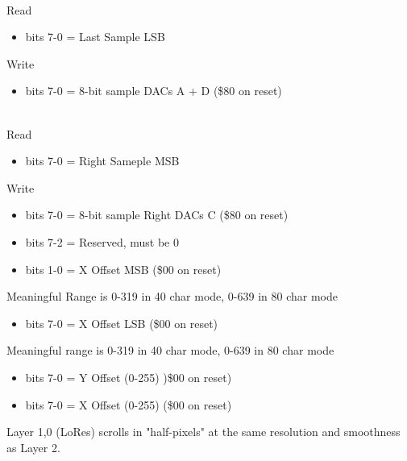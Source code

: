 \\
Read
\begin{itemize}
\item bits 7-0 = \iis Last Sample LSB
\end{itemize}
Write
\begin{itemize}
\item bits 7-0 = 8-bit sample DACs A + D (\$80 on reset)
\end{itemize}

\\
Read
\begin{itemize}
\item bits 7-0 = \iis Right Sameple MSB
\end{itemize}
Write
\begin{itemize}
\item bits 7-0 = 8-bit sample Right DACs C (\$80 on reset)
\end{itemize}

\begin{itemize}
\item bits 7-2 = Reserved, must be 0
\item bits 1-0 = X Offset MSB (\$00 on reset)
\end{itemize}
Meaningful Range is 0-319 in 40 char mode, 0-639 in 80 char mode

\begin{itemize}
\item bits 7-0 = X Offset LSB (\$00 on reset)
\end{itemize}
Meaningful range is 0-319 in 40 char mode, 0-639 in 80 char mode

\begin{itemize}
\item bits 7-0 = Y Offset (0-255) )\$00 on reset)
\end{itemize}

\begin{itemize}
\item bits 7-0 = X Offset (0-255) (\$00 on reset)
\end{itemize}
Layer 1,0 (LoRes) scrolls in "half-pixels" at the same resolution and
smoothness as Layer 2.

